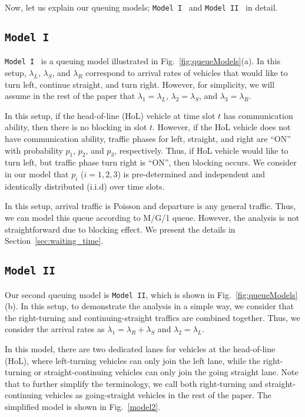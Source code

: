 \documentclass[conference]{IEEEtran}
\newcommand{\modelI}{{\tt{Model I}}}
\newcommand{\modelII}{{\tt{Model II}}}
\begin{document}
Now, let us explain our queuing models; \modelI~ and \modelII~ in detail.

\vspace{-5pt}
\subsection{\modelI}
\modelI~ is a queuing model illustrated in Fig.~\ref{fig:queueModels}(a). In this setup, $\lambda_L$, $\lambda_S$, and $\lambda_R$ correspond to arrival rates of vehicles that would like to turn left, continue straight, and turn right. However, for simplicity, we will assume in the rest of the paper that $\lambda_1 = \lambda_L$, $\lambda_2 = \lambda_S$, and $\lambda_3 = \lambda_R $.

In this setup, if the head-of-line (HoL) vehicle at time slot $t$ has communication ability, then there is no blocking in slot $t$. However, if the HoL vehicle does not have communication ability, traffic phases for left, straight, and right are ``ON'' with probability $p_1$, $p_2$, and $p_3$, respectively. Thus, if HoL vehicle would like to turn left, but traffic phase turn right is ``ON'', then blocking occurs. We consider in our model that $p_i$ ($i=1,2,3$) is pre-determined and independent and identically distributed (i.i.d) over time slots.

In this setup, arrival traffic is Poisson and departure is any general traffic. Thus, we can model this queue according to M/G/1 queue. However, the analysis is not straightforward due to blocking effect. We present the details in Section~\ref{sec:waiting_time}.

\vspace{-5pt}
\subsection{\modelII}
Our second queuing model is \modelII, which is shown in Fig.~\ref{fig:queueModels}(b). In this setup, to demonstrate the analysis in a simple way, we consider that the right-turning and continuing-straight traffics are combined together. Thus, we consider the arrival rates as $\lambda_1 = \lambda_R + \lambda_S$ and $\lambda_2 = \lambda_L$.

In this model, there are two dedicated lanes for vehicles at the head-of-line (HoL), where left-turning vehicles can only join the left lane, while the right-turning or straight-continuing vehicles can only join the going straight lane. Note that to further simplify the terminology, we call both right-turning and straight-continuing vehicles as going-straight vehicles in the rest of the paper. The simplified model is shown in  Fig.~\ref{model2}.
\end{document}
